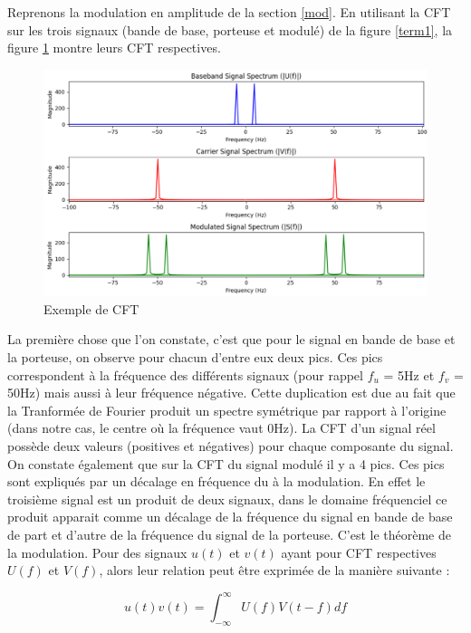 \vspace{0.1cm}

Reprenons la modulation en amplitude de la section \ref{mod}. En utilisant la CFT sur les trois signaux (bande de base, porteuse et modulé) de la figure \ref{term1}, la figure \ref{term8} montre leurs CFT respectives.

\begin{figure}[h]
\centering

\includegraphics[scale=0.5]{images/CFT.PNG}
\caption{Exemple de CFT}\label{term8}
\end{figure}

La première chose que l'on constate, c'est que pour le signal en bande de base et la porteuse, on observe pour chacun d'entre eux deux pics. Ces pics correspondent à la fréquence des différents signaux (pour rappel $f_u$ = 5Hz et $f_v$ = 50Hz) mais aussi à leur fréquence négative. Cette duplication est due au fait que la Tranformée de Fourier produit un spectre symétrique par rapport à l'origine (dans notre cas, le centre où la fréquence vaut 0Hz). La CFT d'un signal réel possède deux valeurs (positives et négatives) pour chaque composante du signal. On constate également que sur la CFT du signal modulé il y a 4 pics. Ces pics sont expliqués par un décalage en fréquence du à la modulation. En effet le troisième signal est un produit de deux signaux, dans le domaine fréquenciel ce produit apparait comme un décalage de la fréquence du signal en bande de base de part et d'autre de la fréquence du signal de la porteuse. C'est le théorème de la modulation. Pour des signaux $u(t)$ et $v(t)$ ayant pour CFT respectives $U(f)$ et $V(f)$, alors leur relation peut être exprimée de la manière suivante :

\begin{equation}
u(t)v(t) = \int_{-\infty}^{\infty} U(f)V(t - f) df
\end{equation}

